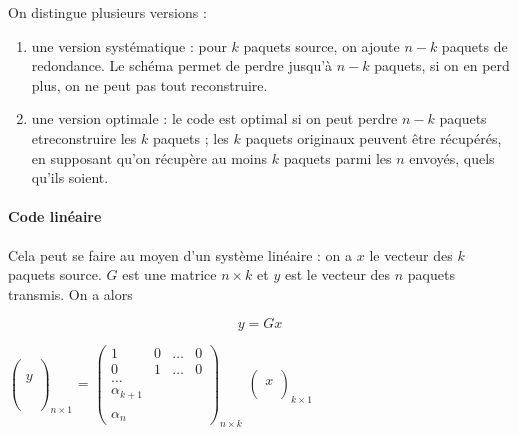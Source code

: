 \documentclass[10pt,a4paper]{report}
\begin{document}
			On distingue plusieurs versions :
			
			\begin{enumerate}
				\item une version systématique : pour $k$ paquets source, on ajoute $n - k$ paquets de redondance. Le schéma permet de perdre jusqu'à $n - k$ paquets, si on en perd plus, on ne peut pas tout reconstruire.
			
				\item une version optimale : le code est optimal si on peut perdre $n - k$ paquets etreconstruire les $k$ paquets ; les $k$ paquets originaux peuvent être récupérés, en supposant qu'on récupère au moins $k$ paquets parmi les $n$ envoyés, quels qu'ils soient.
			
			\end{enumerate}
				
					
			\paragraph{Code linéaire}
			Cela peut se faire au moyen d'un système linéaire : on a $x$ le vecteur des $k$ paquets source. $G$ est une matrice $n \times k$ et $y$ est le vecteur des $n$ paquets transmis. On a alors


			$$y = G x$$
			
			\begin{center}
$	
\begin{pmatrix}
 \\ 
 \\
y \\
 \\ 
 \\
 \\
\end{pmatrix}_{n \times 1}$ = $\begin{pmatrix}
1 & 0 & \dots & 0 \\ 
0 & 1 & \dots & 0 \\ 
\dots &   &   &   \\ 
\alpha_{k + 1} &   &   &   \\ 
  &   &   &   \\ 
\alpha_n &   &   &  
\end{pmatrix}_{n \times k}$ $\begin{pmatrix}
  \\ 
x \\ 
 \\
\end{pmatrix}_{k \times 1}
$
\end{center}
\end{document}
